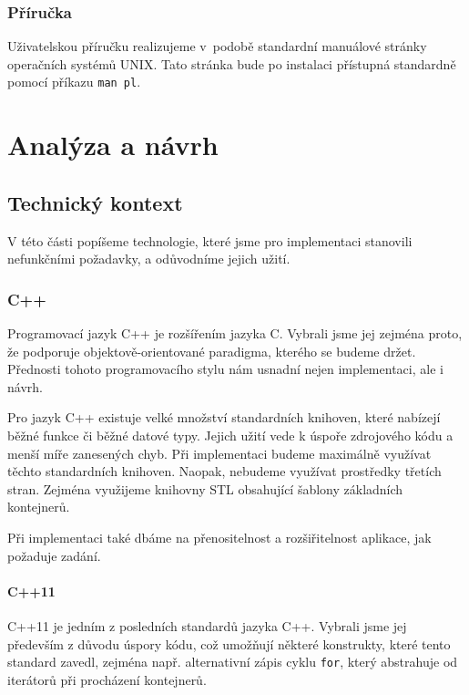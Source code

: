 \documentclass[thesis=B,czech,hidelinks]{thesis}[2012/06/26]
\begin{document}
\subsection{Příručka}

Uživatelskou příručku realizujeme v~podobě standardní manuálové stránky operačních systémů UNIX. Tato stránka bude po instalaci přístupná standardně pomocí příkazu \texttt{man pl}.

%
%
%

\chapter{Analýza a návrh}

\section{Technický kontext}

V této části popíšeme technologie, které jsme pro implementaci stanovili nefunkčními požadavky, a odůvodníme jejich užití.

\subsection{C++}

Programovací jazyk C++ je rozšířením jazyka C. Vybrali jsme jej zejména proto, že podporuje objektově-orientované paradigma, kterého se budeme držet. Přednosti tohoto programovacího stylu nám usnadní nejen implementaci, ale i návrh.

Pro jazyk C++ existuje velké množství standardních knihoven, které nabízejí běžné funkce či běžné datové typy. Jejich užití vede k úspoře zdrojového kódu a menší míře zanesených chyb. Při implementaci budeme maximálně využívat těchto standardních knihoven. Naopak, nebudeme využívat prostředky třetích stran. Zejména využijeme knihovny STL obsahující šablony základních kontejnerů.

Při implementaci také dbáme na přenositelnost a rozšiřitelnost aplikace, jak požaduje zadání.

\subsubsection{C++11}

C++11 je jedním z posledních standardů jazyka C++. Vybrali jsme jej především z důvodu úspory kódu, což umožňují některé konstrukty, které tento standard zavedl, zejména např. alternativní zápis cyklu \texttt{for}, který abstrahuje od iterátorů při procházení kontejnerů\cite{cpp}.
\end{document}
